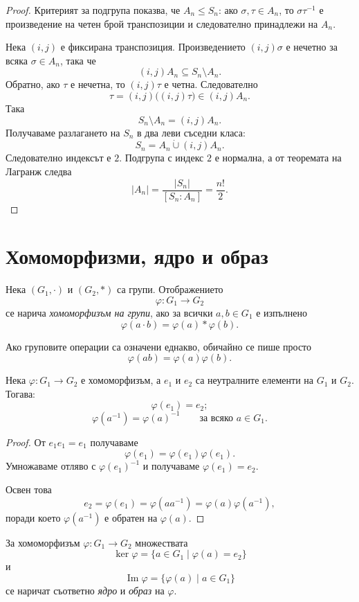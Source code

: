 \begin{proof}
Критерият за подгрупа показва, че $A_n\le S_n$: ако $\sigma,\tau\in A_n$, то $\sigma\tau^{-1}$ е произведение на четен брой транспозиции и следователно принадлежи на $A_n$.

Нека $(i,j)$ е фиксирана транспозиция. Произведението $(i,j)\sigma$ е нечетно за всяка $\sigma\in A_n$, така че
\[
(i,j)A_n\subseteq S_n\setminus A_n.
\]
Обратно, ако $\tau$ е нечетна, то $(i,j)\tau$ е четна. Следователно
\[
\tau=(i,j)\bigl((i,j)\tau\bigr)\in(i,j)A_n.
\]
Така
\[
S_n\setminus A_n=(i,j)A_n.
\]
Получаваме разлагането на $S_n$ в два леви съседни класа:
\[
S_n=A_n\mathbin{\dot\cup}(i,j)A_n.
\]
Следователно индексът е $2$. Подгрупа с индекс $2$ е нормална, а от теоремата на Лагранж следва
\[
|A_n|=\frac{|S_n|}{[S_n:A_n]}=\frac{n!}{2}.
\]
\end{proof}

\section{Хомоморфизми, ядро и образ}\label{s:31.4}

\begin{defn}
Нека $(G_1,\cdot)$ и $(G_2,\ast)$ са групи. Отображението
\[
\varphi\colon G_1\to G_2
\]
се нарича \emph{хомоморфизъм на групи}, ако за всички $a,b\in G_1$ е изпълнено
\[
\varphi(a\cdot b)=\varphi(a)\ast\varphi(b).
\]
\end{defn}

Ако груповите операции са означени еднакво, обичайно се пише просто
\[
\varphi(ab)=\varphi(a)\varphi(b).
\]

\begin{prop}
Нека $\varphi\colon G_1\to G_2$ е хомоморфизъм, а $e_1$ и $e_2$ са неутралните елементи на $G_1$ и $G_2$. Тогава:
\[
\varphi(e_1)=e_2;
\]
\[
\varphi(a^{-1})=\varphi(a)^{-1}
\qquad\text{за всяко }a\in G_1.
\]
\end{prop}

\begin{proof}
От $e_1e_1=e_1$ получаваме
\[
\varphi(e_1)=\varphi(e_1)\varphi(e_1).
\]
Умножаваме отляво с $\varphi(e_1)^{-1}$ и получаваме $\varphi(e_1)=e_2$.

Освен това
\[
e_2=\varphi(e_1)=\varphi(aa^{-1})
=\varphi(a)\varphi(a^{-1}),
\]
поради което $\varphi(a^{-1})$ е обратен на $\varphi(a)$.
\end{proof}

\begin{defn}
За хомоморфизъм $\varphi\colon G_1\to G_2$ множествата
\[
\ker\varphi
=
\{a\in G_1\mid \varphi(a)=e_2\}
\]
и
\[
\operatorname{Im}\varphi
=
\{\varphi(a)\mid a\in G_1\}
\]
се наричат съответно \emph{ядро} и \emph{образ} на $\varphi$.
\end{defn}

